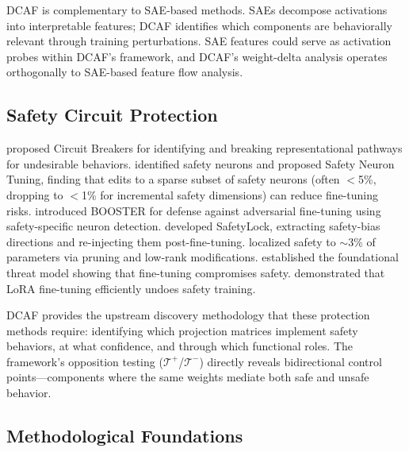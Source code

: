 \documentclass[11pt]{article}
\begin{document}
DCAF is complementary to SAE-based methods. SAEs decompose activations into interpretable features; DCAF identifies which components are behaviorally relevant through training perturbations. SAE features could serve as activation probes within DCAF's framework, and DCAF's weight-delta analysis operates orthogonally to SAE-based feature flow analysis.

\subsection{Safety Circuit Protection}
\label{sec:safety-circuit-protection}

\citet{zou2024circuitbreakers} proposed Circuit Breakers for identifying and breaking representational pathways for undesirable behaviors. \citet{han2025fgsn} identified safety neurons and proposed Safety Neuron Tuning, finding that edits to a sparse subset of safety neurons (often $<$5\%, dropping to $<$1\% for incremental safety dimensions) can reduce fine-tuning risks. \citet{huang2025booster} introduced BOOSTER for defense against adversarial fine-tuning using safety-specific neuron detection. \citet{zhu2025safetylock} developed SafetyLock, extracting safety-bias directions and re-injecting them post-fine-tuning. \citet{wei2024brittleness} localized safety to $\sim$3\% of parameters via pruning and low-rank modifications. \citet{qi2024finetuning} established the foundational threat model showing that fine-tuning compromises safety. \citet{lermen2023lora} demonstrated that LoRA fine-tuning efficiently undoes safety training.

DCAF provides the upstream discovery methodology that these protection methods require: identifying which projection matrices implement safety behaviors, at what confidence, and through which functional roles. The framework's opposition testing ($\mathcal{T}^+$/$\mathcal{T}^-$) directly reveals bidirectional control points---components where the same weights mediate both safe and unsafe behavior.

\subsection{Methodological Foundations}
\label{sec:methodological-foundations}
\end{document}
